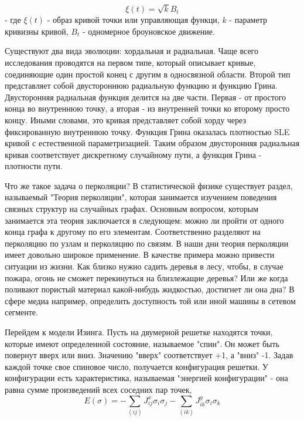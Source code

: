 \documentclass[12pt,a4paper]{article}
\begin{document}
	\begin{equation}\label{invar}
		\xi(t) = \sqrt{k}B_{t}
	\end{equation}
	 - где $\xi(t)$ - образ кривой точки или управляющая функци, $k$ - параметр кривизны кривой, $B_{t}$ - одномерное броуновское движение.
	\par Существуют два вида эволюции: хордальная и радиальная. Чаще всего исследования проводятся на первом типе, который описывает кривые, соединяющие один простой конец с другим в односвязной области\cite{chordal}. Второй тип представляет собой двустороннюю радиальную функцию и функцию Грина\cite{radial}. Двусторонняя радиальная функция делится на две части. Первая - от простого конца во внутреннюю точку, а вторая - из внутренней точки ко второму просто концу. Иными словами, это кривая представляет собой хорду через фиксированную внутреннюю точку. Функция Грина оказалась плотностью SLE кривой с естественной параметризацией. Таким образом двусторонняя радиальная кривая соответствует дискретному случайному пути, а функция Грина - плотности пути. 
	
	
	\par Что же такое задача о перколяции? В статистической физике существует раздел, называемый "Теория перколяции", которая занимается изучением поведения связных структур на случайных графах\cite{crit_perc}. Основным вопросом, которым занимается эта теория заключается в следующем: можно ли пройти от одного конца графа к другому по его элементам. Соответственно разделяют на перколяцию по узлам и перколяцию по связям. В наши дни теория перколяции имеет довольно широкое применение. В качестве примера можно привести ситуации из жизни. Как близко нужно садить деревья в лесу, чтобы, в случае пожара, огонь не сможет перекинуться на близлежащие деревья? Или же когда поливают пористый материал какой-нибудь жидкостью, достигнет ли она дна? В сфере медиа например, определить доступность той или иной машины в сетевом сегменте.
	
	\par Перейдем к модели Изинга\cite{conf_inv}. Пусть на двумерной решетке находятся точки, которые имеют определенной состояние, называемое "спин". Он может быть повернут вверх или вниз. Значению "вверх" соответствует +1, а "вниз" -1. Задав каждой точке свое спиновое число, получается конфигурация решетки. У конфигурации есть характеристика, называемая "энергией конфигурации" - она равна сумме произведений всех соседних пар точек,
	\begin{equation}\label{conf_energy}
		E({\sigma}) = - \sum_{(ij)}J_{ij}^{x}\sigma_{i}\sigma_{j} -\sum_{(ik)}J_{ik}^{y}\sigma_{i}\sigma_{k}
	\end{equation}
	
\end{document}
